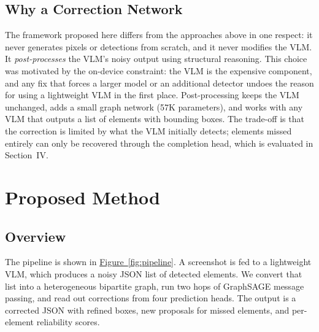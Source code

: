 \documentclass[11pt, letterpaper]{article}
\begin{document}
\subsection{Why a Correction Network}
The framework proposed here differs from the approaches above in one
respect: it never generates pixels or detections from scratch, and it never
modifies the VLM. It \emph{post-processes} the VLM's noisy output using
structural reasoning. This choice was motivated by the on-device constraint:
the VLM is the expensive component, and any fix that forces a larger model or
an additional detector undoes the reason for using a lightweight VLM in the
first place. Post-processing keeps the VLM unchanged, adds a small graph
network (57K parameters), and works with any VLM that outputs a list of
elements with bounding boxes. The trade-off is that the correction is limited
by what the VLM initially detects; elements missed entirely can only be
recovered through the completion head, which is evaluated in Section~IV.

\section{Proposed Method}
\subsection{Overview}
The pipeline is shown in \hyperref[fig:pipeline]{Figure~\ref{fig:pipeline}}. A screenshot is fed to a
lightweight VLM, which produces a noisy JSON list of detected elements. We
convert that list into a heterogeneous bipartite graph, run two hops of
GraphSAGE message passing, and read out corrections from four prediction
heads. The output is a corrected JSON with refined boxes, new proposals for
missed elements, and per-element reliability scores.
\end{document}
